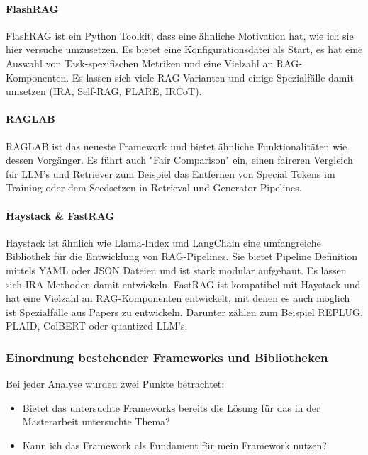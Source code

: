 \documentclass[letterpaper, 10 pt, conference]{ieeeconf}
\begin{document}
\paragraph{FlashRAG\cite{FlashRAG}}

FlashRAG ist ein Python Toolkit, dass eine ähnliche Motivation hat, wie ich sie hier versuche umzusetzen. 
Es bietet eine Konfigurationsdatei als Start, es hat eine Auswahl von Task-spezifischen Metriken und eine Vielzahl an RAG-Komponenten. Es lassen sich viele RAG-Varianten und einige Spezialfälle damit umsetzen (IRA, Self-RAG\cite{Asai.10172023}, FLARE\cite{Jiang.5112023}, IRCoT\cite{Trivedi.12202022}).\\

\paragraph{RAGLAB\cite{zhang-etal-2024-raglab}}
RAGLAB ist das neueste Framework und bietet ähnliche Funktionalitäten wie dessen Vorgänger. Es führt auch "Fair Comparison" ein, einen faireren Vergleich für LLM's und Retriever zum Beispiel das Entfernen von Special Tokens im Training oder dem Seedsetzen in Retrieval und Generator Pipelines.\\


\paragraph{Haystack\cite{Pietsch_Haystack_the_end-to-end_2019} \& FastRAG\cite{Izsak_fastRAG_Efficient_Retrieval_2023}}
Haystack ist ähnlich wie Llama-Index und LangChain eine umfangreiche Bibliothek für die Entwicklung von RAG-Pipelines. Sie bietet Pipeline Definition mittels YAML oder JSON Dateien und ist stark modular aufgebaut. Es lassen sich IRA Methoden damit entwickeln. 
FastRAG ist kompatibel mit Haystack und hat eine Vielzahl an RAG-Komponenten entwickelt, mit denen es auch möglich ist Spezialfälle aus Papers zu entwickeln. 
Darunter zählen zum Beispiel REPLUG\cite{shi2023replugretrievalaugmentedblackboxlanguage}, PLAID\cite{santhanam2022plaidefficientenginelate}, ColBERT\cite{santhanam2022colbertv2effectiveefficientretrieval} oder quantized LLM's.\\

\subsubsection{Einordnung bestehender Frameworks und Bibliotheken}

Bei jeder Analyse wurden zwei Punkte betrachtet:\\
\begin{itemize}
   \item Bietet das untersuchte Frameworks bereits die Lösung für das in der Masterarbeit untersuchte Thema?
   \item Kann ich das Framework als Fundament für mein Framework nutzen?\\
\end{itemize}
\end{document}
